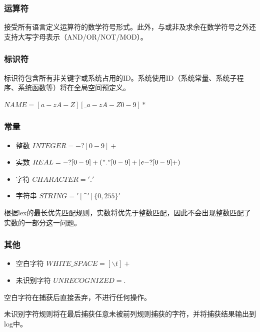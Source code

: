 \documentclass{article}
\begin{document}
\subsubsection{运算符}
\par 接受所有语言定义运算符的数学符号形式。此外，与或非及求余在数学符号之外还支持大写字母表示（AND/OR/NOT/MOD）。
\subsubsection{标识符}
\par 标识符包含所有非关键字或系统占用的ID。系统使用ID（系统常量、系统子程序、系统函数等）将在全局空间预定义。
\par $ NAME = [a-zA-Z][\_a-zA-Z0-9]* $

\subsubsection{常量}
\begin{itemize}
  \item 整数 $ INTEGER = -?[0-9]+ $
  \item 实数 $ REAL = -?[0-9]+("."[0-9]+|e-?[0-9]+) $
  \item 字符 $ CHARACTER = '.' $
  \item 字符串 $ STRING = '[\^{}']\{0,255\}' $
\end{itemize}

\par 根据lex的最长优先匹配规则，实数将优先于整数匹配，因此不会出现整数匹配了实数的一部分这一问题。

\subsubsection{其他}

\begin{itemize}
  \item 空白字符 $ WHITE\_SPACE = [ \backslash t]+ $
  \item 未识别字符 $ UNRECOGNIZED = . $
\end{itemize}

\par 空白字符在捕获后直接丢弃，不进行任何操作。
\par 未识别字符规则将在最后捕获任意未被前列规则捕获的字符，并将捕获结果输出到log中。
\end{document}

